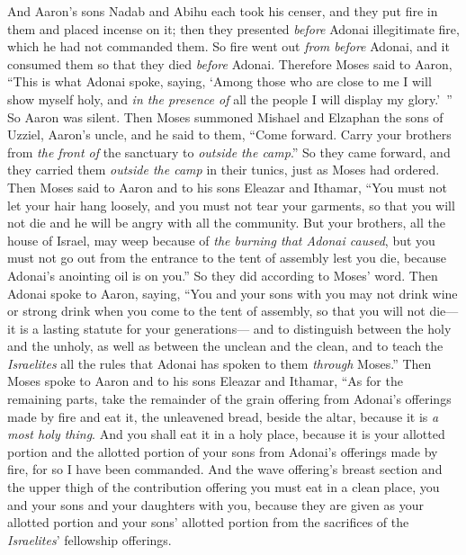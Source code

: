 \begin{biblechapter} %
 And Aaron’s sons Nadab and Abihu each took his censer, and they put fire in them and placed incense on it; then they presented \textit{before} Adonai illegitimate fire, which he had not commanded them.
\verse So fire went out \textit{from before} Adonai, and it consumed them so that they died \textit{before} Adonai.
\verse Therefore Moses said to Aaron, “This is what Adonai spoke, saying, ‘Among those who are close to me I will show myself holy, and \textit{in the presence of} all the people I will display my glory.’ ” So Aaron was silent.
\verse Then Moses summoned Mishael and Elzaphan the sons of Uzziel, Aaron’s uncle, and he said to them, “Come forward. Carry your brothers from \textit{the front of} the sanctuary to \textit{outside the camp}.”
\verse So they came forward, and they carried them \textit{outside the camp} in their tunics, just as Moses had ordered.
\verse Then Moses said to Aaron and to his sons Eleazar and Ithamar, “You must not let your hair hang loosely, and you must not tear your garments, so that you will not die and he will be angry with all the community. But your brothers, all the house of Israel, may weep because of \textit{the burning that Adonai caused},
\verse but you must not go out from the entrance to the tent of assembly lest you die, because Adonai’s anointing oil is on you.” So they did according to Moses’ word.
 Then Adonai spoke to Aaron, saying,
\verse “You and your sons with you may not drink wine or strong drink when you come to the tent of assembly, so that you will not die—it is a lasting statute for your generations—
\verse and to distinguish between the holy and the unholy, as well as between the unclean and the clean,
\verse and to teach the \textit{Israelites} all the rules that Adonai has spoken to them \textit{through} Moses.”
\verse Then Moses spoke to Aaron and to his sons Eleazar and Ithamar, “As for the remaining parts, take the remainder of the grain offering from Adonai’s offerings made by fire and eat it, the unleavened bread, beside the altar, because it is \textit{a most holy thing}.
\verse And you shall eat it in a holy place, because it is your allotted portion and the allotted portion of your sons from Adonai’s offerings made by fire, for so I have been commanded.
\verse And the wave offering’s breast section and the upper thigh of the contribution offering you must eat in a clean place, you and your sons and your daughters with you, because they are given as your allotted portion and your sons’ allotted portion from the sacrifices of the \textit{Israelites}’ fellowship offerings.

\end{biblechapter}
